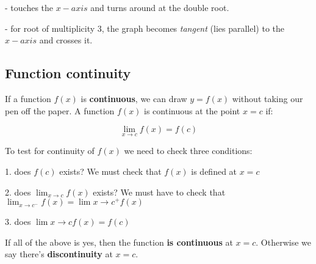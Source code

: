 \documentclass{article}
\begin{document}
- touches the $x-axis$ and turns around at the double root.

- for root of multiplicity 3, the graph becomes \textit{tangent} (lies parallel) to the $x-axis$ and crosses it.

\subsection{Function continuity}
If a function $f(x)$ is \textbf{continuous}, we can draw $y = f(x)$ without
taking our pen off the paper. A function $f(x)$ is continuous at the point
$x = c$ if:

\begin{equation}
  \lim_{x \to c}f(x) = f(c)
\end{equation}

To test for continuity of $f(x)$ we need to check three conditions:

1. does $f(c)$ exists?
We must check that $f(x)$ is defined at $x=c$

2. does $\lim_{x \to c}f(x)$ exists?
We must have to check that $\lim_{x \to c^-}f(x) = \lim{x \to c^+}f(x)$

3. does $\lim{x \to c}f(x) = f(c)$

If all of the above is yes, then the function \textbf{is continuous} at $x = c$.
Otherwise we say there's \textbf{discontinuity} at $x = c$.

\end{document}
